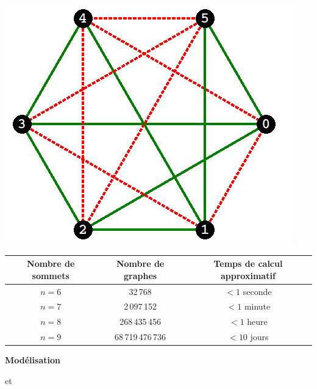 \documentclass[12pt,class=report,crop=false]{standalone}
\begin{document}
\begin{center}
\includegraphics[scale=0.4]{ecran-ramsey-1d}
\end{center} 

\bigskip
\bigskip

  \begin{center}
  \begin{tabular}{|c|c|c|}
  \hline
  Nombre de sommets & Nombre de graphes & Temps de calcul approximatif \\
  \hline\hline
  $n=6$ & 32\,768 & $< 1$ seconde \\
  $n=7$ & 2\,097\,152 & $< 1$ minute \\  
  $n=8$ & 268\,435\,456 & $< 1$ heure \\
  $n=9$ & 68\,719\,476\,736 & $< 10$ jours \\ 
  \hline
  \end{tabular} 
  \end{center}
  
  
  
\newpage

\textbf{Modélisation}




\bigskip
\bigskip
\begin{center}

\bigskip
\bigskip   
   
    \quad et \quad {}
\end{center}  
  
\end{document}
